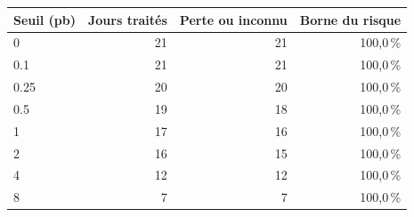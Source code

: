 \begin{tabular}{@{}lrrr@{}}
\toprule
Seuil (pb) & Jours traités & Perte ou inconnu & Borne du risque\\
\midrule
0 & 21 & 21 & 100,0\,\%\\
0.1 & 21 & 21 & 100,0\,\%\\
0.25 & 20 & 20 & 100,0\,\%\\
0.5 & 19 & 18 & 100,0\,\%\\
1 & 17 & 16 & 100,0\,\%\\
2 & 16 & 15 & 100,0\,\%\\
4 & 12 & 12 & 100,0\,\%\\
8 & 7 & 7 & 100,0\,\%\\
\bottomrule
\end{tabular}
